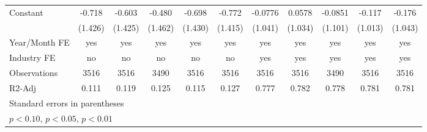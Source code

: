 \begin{table}[htbp]
\begin{tabular}{l*{10}{c}}
Constant        &   -0.718         &   -0.603         &   -0.480         &   -0.698         &   -0.772         &  -0.0776         &   0.0578         &  -0.0851         &   -0.117         &   -0.176         \\
                &  (1.426)         &  (1.425)         &  (1.462)         &  (1.430)         &  (1.415)         &  (1.041)         &  (1.034)         &  (1.101)         &  (1.013)         &  (1.043)         \\
\hline
Year/Month FE   &      yes         &      yes         &      yes         &      yes         &      yes         &      yes         &      yes         &      yes         &      yes         &      yes         \\
Industry FE     &       no         &       no         &       no         &       no         &       no         &      yes         &      yes         &      yes         &      yes         &      yes         \\
Observations    &     3516         &     3516         &     3490         &     3516         &     3516         &     3516         &     3516         &     3490         &     3516         &     3516         \\
R2-Adj          &    0.111         &    0.119         &    0.125         &    0.115         &    0.127         &    0.777         &    0.782         &    0.778         &    0.781         &    0.781         \\
\hline\hline
\multicolumn{11}{l}{\footnotesize Standard errors in parentheses}\\
\multicolumn{11}{l}{\footnotesize \sym{*} \(p<0.10\), \sym{**} \(p<0.05\), \sym{***} \(p<0.01\)}\\
\end{tabular}
\end{table}
